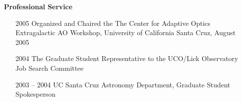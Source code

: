 \documentclass[12pt]{article}
\begin{document}
\noindent
{\bf{Professional Service}}
\begin{itemize}
\addtolength{\itemsep}{-0.25cm}
\item[2005] Organized and Chaired the The Center for Adaptive Optics Extragalactic AO Workshop, University of California Santa Cruz, August 2005
\item[2004] The Graduate Student Representative to the UCO/Lick Observatory Job Search Committee
\item[2003] -- 2004 UC Santa Cruz Astronomy Department, Graduate Student Spokesperson
\end{itemize}








\end{document}

